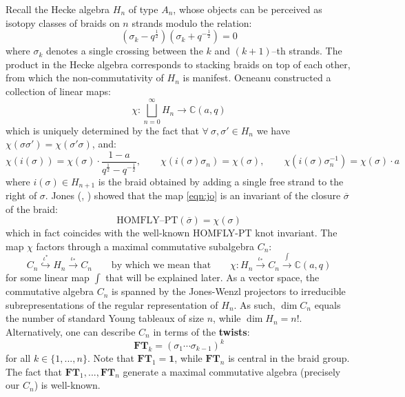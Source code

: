 \documentclass[12pt]{amsart}
\numberwithin{equation}{section}
\theoremstyle{definition}
\theoremstyle{remark}
\newcommand{\CC}{\mathbb{C}}
\newcommand{\FT}{\mathbf{FT}}
\renewcommand{\1}{\mathbf{1}}
\newcommand{\HOM}{\text{HOMFLY--PT}}
\begin{document}
Recall the Hecke algebra $H_n$ of type $A_n$, whose objects can be perceived as isotopy classes of braids on $n$ strands modulo the relation:
$$
\left(\sigma_k - q^{\frac 12} \right)\left(\sigma_k + q^{-\frac 12} \right) = 0 %
$$ 
where $\sigma_k$ denotes a single crossing between the $k$ and $(k+1)$--th strands. The product in the Hecke algebra corresponds to stacking braids on top of each other, from which the non-commutativity of $H_n$ is manifest. Ocneanu constructed a collection of linear maps:
\begin{equation}
\label{eqn:jo}
\chi : \bigsqcup_{n=0}^\infty H_n \rightarrow \CC(a,q)
\end{equation}
which is uniquely determined by the fact that $\forall \ \sigma,\sigma' \in H_n$ we have $\chi(\sigma \sigma') = \chi(\sigma' \sigma)$, and:
\begin{equation}
\label{eqn:jo2}
\chi(i(\sigma)) = \chi(\sigma) \cdot \frac{1-a}{q^{\frac 12} - q^{-\frac 12}}, \qquad
\chi(i(\sigma) \sigma_n) = \chi(\sigma), \qquad \chi(i(\sigma) \sigma_n^{-1}) = \chi(\sigma) \cdot a
\end{equation}
where $i(\sigma) \in H_{n+1}$ is the braid obtained by adding a single free strand to the right of $\sigma$. Jones (\cite{Jones}, \cite{HOMFLY}) showed that the map \eqref{eqn:jo} is an invariant of the closure $\overline{\sigma}$ of the braid:
\begin{equation}
\label{eqn:jones}
\HOM(\overline{\sigma}) = \chi(\sigma)
\end{equation}
which in fact coincides with the well-known HOMFLY-PT knot invariant. The map $\chi$ factors through a maximal commutative subalgebra \(C_n\):
\begin{equation}
\label{eqn:subalgebra}
C_n \stackrel{\iota^*}\hookrightarrow H_n \stackrel{\iota_*}\longrightarrow C_n \qquad \text{by which we mean that} \qquad \chi: H_n \stackrel{\iota_*}\longrightarrow C_n \stackrel{\int}\longrightarrow \CC(a,q)
\end{equation}
for some linear map $\int$ that will be explained later. As a vector space, the commutative algebra $C_n$ is spanned by the Jones-Wenzl projectors to irreducible subrepresentations of the regular representation of $H_n$. As such, $\dim C_n$ equals the number of standard Young tableaux of size $n$, while $\dim H_n = n!$. Alternatively, one can describe $C_n$ in terms of the \textbf{twists}:
\begin{equation}
\label{eqn:fulltwist}
\FT_k=(\sigma_1\cdots\sigma_{k-1})^{k}
\end{equation}
for all $k\in \{1,...,n\}$. Note that $\FT_1 = \1$, while $\FT_n$ is central in the braid group. The fact that $\FT_1,...,\FT_n$ generate a maximal commutative algebra (precisely our $C_n$) is well-known.
\end{document}
